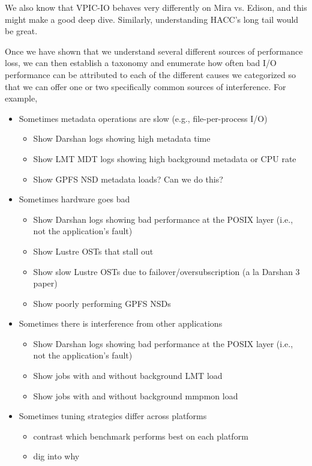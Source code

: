 \documentclass[conference,10pt,compsocconf]{IEEEtran}
\begin{document}
We also know that VPIC-IO behaves very differently on Mira vs. Edison, and this
might make a good deep dive.  Similarly, understanding HACC's long tail would
be great.

Once we have shown that we understand several different sources of performance
loss, we can then establish a taxonomy and enumerate how often bad I/O
performance can be attributed to each of the different causes we categorized so
that we can offer one or two specifically common sources of interference.  For
example,

\begin{itemize}
\item Sometimes metadata operations are slow (e.g., file-per-process I/O)
    \begin{itemize}
    \item Show Darshan logs showing high metadata time
    \item Show LMT MDT logs showing high background metadata or CPU rate
    \item Show GPFS NSD metadata loads?  Can we do this?
    \end{itemize}
\item Sometimes hardware goes bad
    \begin{itemize}
    \item Show Darshan logs showing bad performance at the POSIX layer (i.e., not the
    application's fault)
    \item Show Lustre OSTs that stall out
    \item Show slow Lustre OSTs due to failover/oversubscription (a la Darshan 3 paper)
    \item Show poorly performing GPFS NSDs
    \end{itemize}
\item Sometimes there is interference from other applications
    \begin{itemize}
    \item Show Darshan logs showing bad performance at the POSIX layer (i.e., not the
    application's fault)
    \item Show jobs with and without background LMT load
    \item Show jobs with and without background mmpmon load
    \end{itemize}
\item Sometimes tuning strategies differ across platforms
    \begin{itemize}
    \item contrast which benchmark performs best on each platform
    \item dig into why
    \end{itemize}
\end{itemize}
\end{document}
